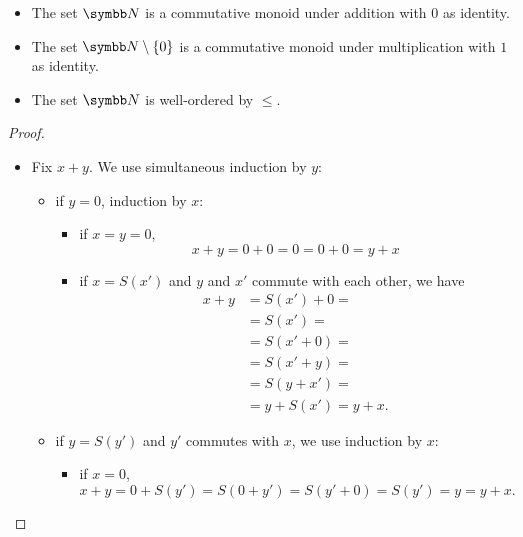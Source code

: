 \begin{proposition}\label{def:natural_numbers}
  \begin{itemize}\mbox{}
    \item The set \( \BN \) is a commutative monoid under addition with \( 0 \) as identity.
    \item The set \( \BN \setminus \{ 0 \} \) is a commutative monoid under multiplication with \( 1 \) as identity.
    \item The set \( \BN \) is well-ordered by \( \leq \).
  \end{itemize}
\end{proposition}
\begin{proof}
  \begin{itemize}\mbox{}
    \item Fix \( x + y \). We use simultaneous induction by \( y \):
    \begin{itemize}
      \item if \( y = 0 \), induction by \( x \):
      \begin{itemize}
        \item if \( x = y = 0 \),
        \begin{equation*}
          x + y = 0 + 0 = 0 = 0 + 0 = y + x
        \end{equation*}

        \item if \( x = S(x') \) and \( y \) and \( x' \) commute with each other, we have
        \begin{align*}
          x + y
          &=
          S(x') + 0
          = \\ &=
          S(x')
          = \\ &=
          S(x' + 0)
          = \\ &=
          S(x' + y)
          = \\ &=
          S(y + x')
          = \\ &=
          y + S(x')
          =
          y + x.
        \end{align*}
      \end{itemize}

      \item if \( y = S(y') \) and \( y' \) commutes with \( x \), we use induction by \( x \):
      \begin{itemize}
        \item if \( x = 0 \),
        \begin{equation*}
          x + y = 0 + S(y') = S(0 + y') = S(y' + 0) = S(y') = y = y + x.
        \end{equation*}


\end{itemize}
\end{itemize}
\end{itemize}
\end{proof}

